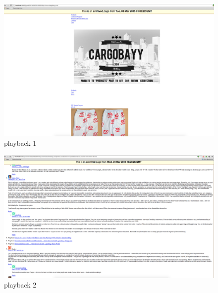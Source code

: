 \documentclass[12pt]{Report}
\begin{document}
\newpage
\begin{figure}[ht]    
    \begin{center}
        \includegraphics[scale=0.60]{pywb1.png}
        \caption{playback 1}
        \label{pywb playback}
    \end{center}
\end{figure}
\newpage
\begin{figure}[ht]    
    \begin{center}
        \includegraphics[scale=0.60]{pywb2.png}
        \caption{playback 2}
        \label{pywb playback}
    \end{center}
\end{figure}
\newpage



 
\end{document}
